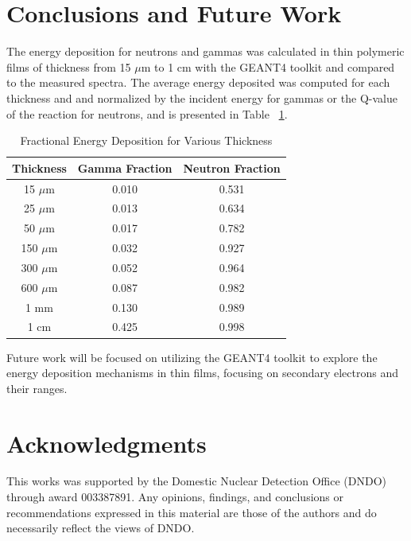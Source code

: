 \documentclass{anstrans}
\newcommand{\micron}{$\mu$m }
\begin{document}
\section{Conclusions and Future Work}
The energy deposition for neutrons and gammas was calculated in thin polymeric films of thickness from 15 \micron to 1 cm with the GEANT4 toolkit and compared to the measured spectra.
The average energy deposited was computed for each thickness and and normalized by the incident energy for gammas or the Q-value of the reaction for neutrons, and is presented in Table ~\ref{tab:FractionEDep}.
\begin{table}[!htb]
    \caption{Fractional Energy Deposition for Various Thickness}
	\centering
	\begin{tabular}{c | c c}
	Thickness & Gamma Fraction & Neutron Fraction \\
	\hline
	\hline
	15 \micron & 0.010 & 0.531 \\
	25 \micron & 0.013 & 0.634 \\
	50 \micron & 0.017 & 0.782 \\
	150 \micron & 0.032 & 0.927 \\
	300 \micron & 0.052 & 0.964 \\
	600 \micron & 0.087 & 0.982 \\
	1 mm & 0.130 & 0.989 \\
	1 cm & 0.425 & 0.998 \\
	\hline
	\end{tabular}
    \label{tab:FractionEDep}
\end{table}
Future work will be focused on utilizing the GEANT4 toolkit to explore the energy deposition mechanisms in thin films, focusing on secondary electrons and their ranges. 
\section{Acknowledgments}
This works was supported by the Domestic Nuclear Detection Office (DNDO) through award 003387891.
Any opinions, findings, and conclusions or recommendations expressed in this material are those of the authors and do necessarily reflect the views of DNDO.


\end{document}
